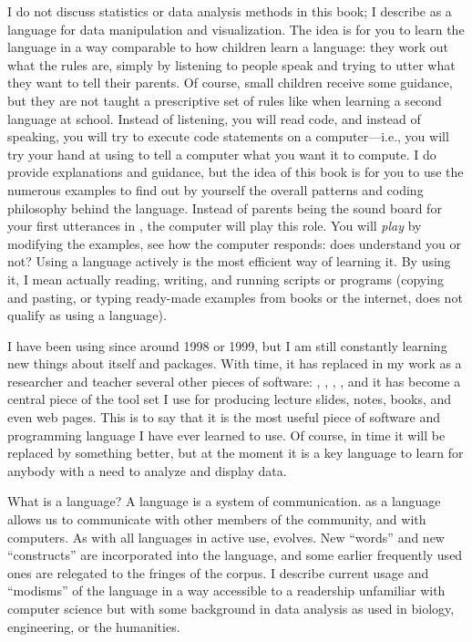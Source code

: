 I do not discuss statistics or data analysis methods in this book; I describe \Rlang as a language for data manipulation and visualization. The idea is for you to learn the \Rlang language in a way comparable to how children learn a language: they work out what the rules are, simply by listening to people speak and trying to utter what they want to tell their parents. Of course, small children receive some guidance, but they are not taught a prescriptive set of rules like when learning a second language at school. Instead of listening, you will read code, and instead of speaking, you will try to execute \Rlang  code statements on a computer---i.e., you will try your hand at using \Rlang to tell a computer what you want it to compute. I do provide explanations and guidance, but the idea of this book is for you to use the numerous examples to find out by yourself the overall patterns and coding philosophy behind the \Rlang language. Instead of parents being the sound board for your first utterances in \Rlang, the computer will play this role. You will \emph{play} by modifying the examples, see how the computer responds: does \Rlang understand you or not? Using a language actively is the most efficient way of learning it. By using it, I mean actually reading, writing, and running scripts or programs (copying and pasting, or typing ready-made examples from books or the internet, does not qualify as using a language).

I have been using \Rlang since around 1998 or 1999, but I am still constantly learning new things about \Rlang itself and \Rlang packages. With time, it has replaced in my work as a researcher and teacher several other pieces of software: , , , , and it has become a central piece of the tool set I use for producing lecture slides, notes, books, and even web pages. This is to say that it is the most useful piece of software and programming language I have ever learned to use. Of course, in time it will be replaced by something better, but at the moment it is a key language to learn for anybody with a need to analyze and display data.

What is a language? A language is a system of communication. \Rlang as a language allows us to communicate with other members of the \Rlang community, and with computers. As with all languages in active use, \Rlang evolves. New ``words'' and new ``constructs'' are incorporated into the language, and some earlier frequently used ones are relegated to the fringes of the corpus. I describe current usage and ``modisms'' of the \Rlang language in a way accessible to a readership unfamiliar with computer science but with some background in data analysis as used in biology, engineering, or the humanities.

